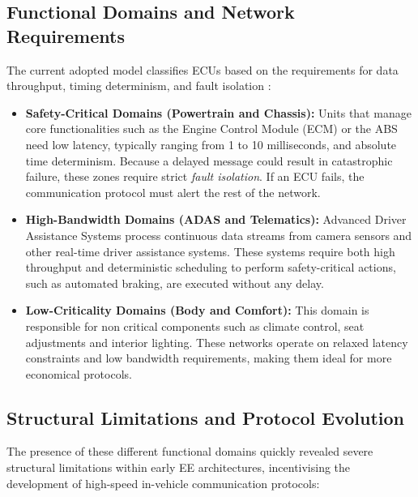 \subsection{Functional Domains and Network Requirements}\label{subsec:network_requirements}
The current adopted model classifies ECUs based on the requirements for data throughput, timing determinism, and fault isolation \cite{Automotivecommunications}:

\begin{itemize}
    \item \textbf{Safety-Critical Domains (Powertrain and Chassis):} Units that manage core functionalities such as the Engine Control Module (ECM) or the ABS need low latency, typically ranging from 1 to 10 milliseconds, and absolute time determinism. Because a delayed message could result in catastrophic failure, these zones require strict \textit{fault isolation}. If an ECU fails, the communication protocol must alert the rest of the network.
    \item \textbf{High-Bandwidth Domains (ADAS and Telematics):} Advanced Driver Assistance Systems process continuous data streams from camera sensors and other real-time driver assistance systems. These systems require both high throughput and deterministic scheduling to perform safety-critical actions, such as automated braking, are executed without any delay.
    \item \textbf{Low-Criticality Domains (Body and Comfort):} This domain is responsible for non critical components such as climate control, seat adjustments and interior lighting. These networks operate on relaxed latency constraints and low bandwidth requirements, making them ideal for more economical protocols.
\end{itemize}

\subsection{Structural Limitations and Protocol Evolution}
The presence of these different functional domains quickly revealed severe structural limitations within early \gls{EE} architectures, incentivising the development of high-speed in-vehicle communication protocols:

